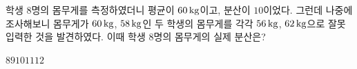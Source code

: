 학생 $8$명의 몸무게를 측정하였더니 평균이 $60\mkern3mu \mathrm{kg}$이고, 분산이 $10$이었다. 그런데 나중에 조사해보니 몸무게가 $60\mkern3mu \mathrm{kg}$, $58\mkern3mu \mathrm{kg}$인 두 학생의 몸무게를 각각 $56\mkern3mu \mathrm{kg}$, $62\mkern3mu \mathrm{kg}$으로 잘못 입력한 것을 발견하였다. 이때 학생 $8$명의 몸무게의 실제 분산은?
\begin{choices32}{$8$}{$9$}{$10$}{$11$}{$12$}\end{choices32}
